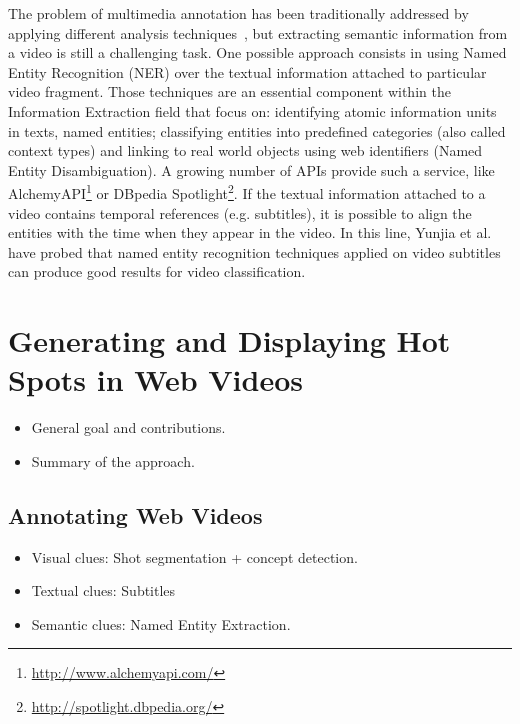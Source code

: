 \documentclass{llncs}
\begin{document}
The problem of multimedia annotation has been traditionally addressed by applying different analysis techniques~\cite{ballan2011event}, but extracting semantic information from a video is still a challenging task. One possible approach consists in using Named Entity Recognition (NER) over the textual information attached to particular video fragment. Those techniques are an essential component within the Information Extraction field that focus on: identifying atomic information units in texts, named entities; classifying entities into predefined categories (also called context types) and linking to real world objects using web identifiers (Named Entity Disambiguation). A growing number of APIs provide such a service, like AlchemyAPI\footnote{\fontsize{8pt}{1em}\selectfont \url{http://www.alchemyapi.com/}} or DBpedia Spotlight\footnote{\fontsize{8pt}{1em}\selectfont \url{http://spotlight.dbpedia.org/}}. If the textual information attached to a video contains temporal references (e.g. subtitles), it is possible to align the entities with the time when they appear in the video. In this line, Yunjia et al.~\cite{yunjia2013} have probed that named entity recognition techniques applied on video subtitles can produce good results for video classification. 



\section{Generating and Displaying Hot Spots in Web Videos}
\label{sec:hotspots}

\begin{itemize}
  \item General goal and contributions.
  \item Summary of the approach.
\end{itemize}

\subsection{Annotating Web Videos}
\label{sec:videoannotation}

\begin{itemize}
  \item Visual clues: Shot segmentation + concept detection.
  \item Textual clues: Subtitles
  \item Semantic clues: Named Entity Extraction.
\end{itemize}
\end{document}
